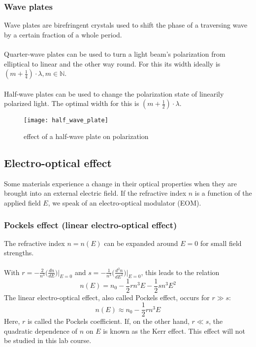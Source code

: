 \subsubsection{Wave plates}
Wave plates are birefringent crystals used to shift the phase of a
traversing wave by a certain fraction of a whole period. \\ \\
Quarter-wave plates can be used to turn a light beam's polarization
from elliptical to linear and the other way round. For this its
width ideally is $(m+\frac{1}{4})\cdot\lambda, m\in\mathbb{N}$. \\ \\ Half-wave plates
can be used to change the polarization state of linearily polarized
light. The optimal width for this is $(m+\frac{1}{2})\cdot\lambda$.
\begin{figure}[h!]
    \center
    \texttt{[image: half\_wave\_plate]}
    \caption{effect of a half-wave plate on polarization}
    \label{half_wave_plate}
\end{figure}


\newpage
\subsection{Electro-optical effect}
Some materials experience a change in their optical properties when they are
brought into an external electric field. If the refractive index $n$ is a
function of the applied field $E$, we speak of an electro-optical modulator
(EOM).

\subsubsection{Pockels effect (linear electro-optical effect)}
The refractive index $n=n(E)$ can be expanded around $E=0$
for small field strengths. \\ \\ With
$r=-\frac{2}{n^3}\bigg(\frac{dn}{dE}\bigg)\bigg|_{E=0}$ and
$s=-\frac{1}{n^3}\bigg(\frac{d^2n}{dE^2}\bigg)\bigg|_{E=0}$,
this leads to the relation
\begin{equation}
    n(E)=n_0-\frac{1}{2}rn^3E-\frac{1}{2}sn^3E^2
\end{equation}
The linear electro-optical effect, also called Pockels effect,
occurs for $r\gg s$:
\begin{equation}
    n(E)\approx n_0-\frac{1}{2}rn^3E
\end{equation}
Here, $r$ is called the Pockels coefficient. If, on the other hand, $r\ll s$,
the quadratic dependence of $n$ on $E$ is known as the Kerr effect.
This effect will not be studied in this lab course.

